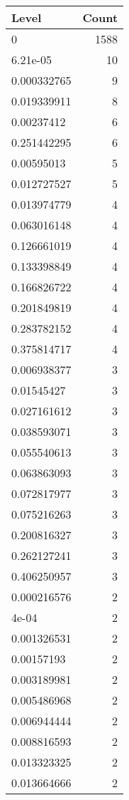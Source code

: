 \begin{table}[ht]
\centering
\begin{tabular}{lr}
  \hline
Level & Count \\ 
  \hline
0 & 1588 \\ 
  6.21e-05 &  10 \\ 
  0.000332765 &   9 \\ 
  0.019339911 &   8 \\ 
  0.00237412 &   6 \\ 
  0.251442295 &   6 \\ 
  0.00595013 &   5 \\ 
  0.012727527 &   5 \\ 
  0.013974779 &   4 \\ 
  0.063016148 &   4 \\ 
  0.126661019 &   4 \\ 
  0.133398849 &   4 \\ 
  0.166826722 &   4 \\ 
  0.201849819 &   4 \\ 
  0.283782152 &   4 \\ 
  0.375814717 &   4 \\ 
  0.006938377 &   3 \\ 
  0.01545427 &   3 \\ 
  0.027161612 &   3 \\ 
  0.038593071 &   3 \\ 
  0.055540613 &   3 \\ 
  0.063863093 &   3 \\ 
  0.072817977 &   3 \\ 
  0.075216263 &   3 \\ 
  0.200816327 &   3 \\ 
  0.262127241 &   3 \\ 
  0.406250957 &   3 \\ 
  0.000216576 &   2 \\ 
  4e-04 &   2 \\ 
  0.001326531 &   2 \\ 
  0.00157193 &   2 \\ 
  0.003189981 &   2 \\ 
  0.005486968 &   2 \\ 
  0.006944444 &   2 \\ 
  0.008816593 &   2 \\ 
  0.013323325 &   2 \\ 
  0.013664666 &   2 \\ 

\end{tabular}
\end{table}
